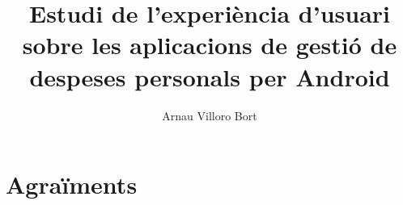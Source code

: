 \documentclass{book}
\title{Estudi de l'experiència d'usuari sobre les aplicacions de gestió de despeses personals per Android}
\author{Arnau Villoro Bort}
\begin{document}
\newcommand{\blueA}{\cellcolor{blue_table_1}}
\newcommand{\blueB}{\cellcolor{blue_table_2}}
\newcommand{\blueC}{\cellcolor{blue_table_3}}
\newcommand{\headA}[1]{\multicolumn{1}{|c|}{\blueA \textbf{#1}}}
\newcommand{\headB}[1]{\multicolumn{1}{|c|}{\blueB \textbf{#1}}}
\newcommand{\headC}[1]{\multicolumn{1}{|c|}{\blueC \textbf{#1}}}
\newcommand{\noBorde}[1]{\multicolumn{1}{#1}{}}


\frontmatter






\tableofcontents
{}
\listoffigures
{}
\listoftables
{}






\mainmatter











\chapter{Agraïments}


\end{document}
